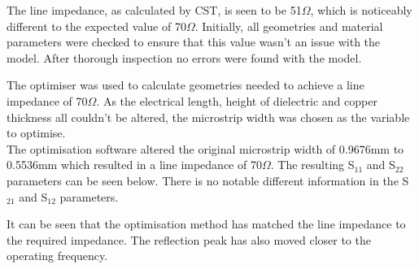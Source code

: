 The line impedance, as calculated by CST, is seen to be 51$\Omega$, which is noticeably different to the expected value of 70$\Omega$. Initially, all geometries and material parameters were checked to ensure that this value wasn't an issue with the model. After thorough inspection no errors were found with the model.




The optimiser was used to calculate geometries needed to achieve a line impedance of 70$\Omega$. As the electrical length, height of dielectric and copper thickness all couldn't be altered, the microstrip width was chosen as the variable to optimise.\\

The optimisation software altered the original microstrip width of 0.9676mm to 0.5536mm which resulted in a line impedance of 70$\Omega$. The resulting S$_{11}$ and S$_{22}$ parameters can be seen below. There is no notable different information in the S$_{21}$ and S$_{12}$ parameters.



It can be seen that the optimisation method has matched the line impedance to the required impedance. The reflection peak has also moved closer to the operating frequency.